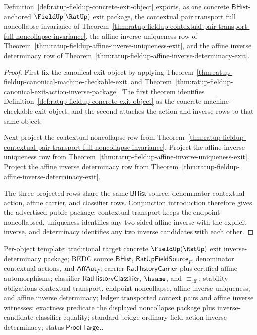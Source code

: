 \begin{theorem}
\label{thm:ratup-fieldup-canonical-exit-inverse-determinacy-package}
Definition~\ref{def:ratup-fieldup-concrete-exit-object} exports, as one
concrete $\mathsf{BHist}$-anchored $\FieldUp(\RatUp)$ exit package, the
contextual pair transport full noncollapse invariance of
Theorem~\ref{thm:ratup-fieldup-contextual-pair-transport-full-noncollapse-invariance},
the affine inverse uniqueness row of
Theorem~\ref{thm:ratup-fieldup-affine-inverse-uniqueness-exit}, and the affine
inverse determinacy row of
Theorem~\ref{thm:ratup-fieldup-affine-inverse-determinacy-exit}.
\end{theorem}
\begin{proof}
First fix the canonical exit object by applying
Theorem~\ref{thm:ratup-fieldup-canonical-machine-checkable-exit} and
Theorem~\ref{thm:ratup-fieldup-canonical-exit-action-inverse-package}. The first
theorem identifies Definition~\ref{def:ratup-fieldup-concrete-exit-object} as
the concrete machine-checkable exit object, and the second attaches the action
and inverse rows to that same object.

Next project the contextual noncollapse row from
Theorem~\ref{thm:ratup-fieldup-contextual-pair-transport-full-noncollapse-invariance}.
Project the affine inverse uniqueness row from
Theorem~\ref{thm:ratup-fieldup-affine-inverse-uniqueness-exit}. Project the
affine inverse determinacy row from
Theorem~\ref{thm:ratup-fieldup-affine-inverse-determinacy-exit}.

The three projected rows share the same $\mathsf{BHist}$ source, denominator
contextual action, affine carrier, and classifier rows. Conjunction introduction
therefore gives the advertised public package: contextual transport keeps the
endpoint noncollapsed, uniqueness identifies any two-sided affine inverse with
the explicit inverse, and determinacy identifies any two inverse candidates
with each other.
\end{proof}

Per-object template: traditional target concrete $\FieldUp(\RatUp)$ exit
inverse-determinacy package; BEDC source $\mathsf{BHist}$,
$\mathsf{RatUpFieldSource}_F$, denominator contextual actions, and
$\mathsf{AffAut}_F$; carrier $\mathsf{RatHistoryCarrier}$ plus certified affine
automorphisms; classifier $\mathsf{RatHistoryClassifier}$, $\hsame$, and
$\equiv_{\mathrm{aff}}$; stability obligations contextual transport, endpoint
noncollapse, affine inverse uniqueness, and affine inverse determinacy; ledger
transported context pairs and affine inverse witnesses; exactness predicate the
displayed noncollapse package plus inverse-candidate classifier equality;
standard bridge ordinary field action inverse determinacy; status
$\mathsf{ProofTarget}$.

